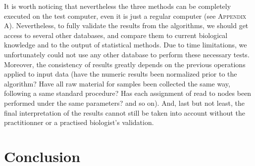 \documentclass{beamer}
\begin{document}
\begin{frame}
It is worth noticing that nevertheless the three methods can be completely executed on the test computer, even it is just a regular computer (see \textsc{Appendix A}). Nevertheless, to fully validate the results from the algorithms, we should get access to several other databases, and compare them to current biological knowledge and to the output of statistical methods. Due to time limitations, we unfortunately could not use any other database to perform these necessary tests. Moreover, the consistency of results greatly depends on the previous operations applied to input data (have the numeric results been normalized prior to the algorithm? Have all raw material for samples been collected the same way, following a same standard procedure? Has each assignment of read to nodes been performed under the same parameters? and so on). And, last but not least, the final interpretation of the results cannot still be taken into account without the practitionner or a practised biologist's validation.

\end{frame}

\section{Conclusion}

\end{document}
